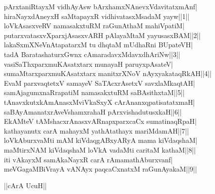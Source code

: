 \documentclass{article}
\begin{document}
pArxtaniRtayxM vidhAyAsw bArxhamxNAnevxVdavitatxmAnf|\\
hiraNayxdAneyxH saMtapayxR vidhivatasxMsadaM yayw||1||\\
loVkAsasxveRV namasakxtuRM raGunAthaM mahiVpatiM|\\
putarxvatasxvXparxjAsasxvARH pAlayaMtaM yayusasxBAM||2||\\
lakaSxmXNeVnAtapatarxM tu dhqtaM mUdhaRni BUpateVH|\\
tadA BaratashaturxGwnx cAmaradavxMdavxdhAriNw||3||\\
vasiSaThxparxmuKAsatxtarx munayaH paruyxpAsateV|\\
sumaMtarxparxmuKAsatxtarx manitxrXNoV nAyxyakataqRkAH||4||\\
EvaM parxvaqtetxV samayeV SaTAcxrAsetxV savxlaMkaqtAH|\\
samAjagumxnaRrapatiM namasakxtuRM saBAsithxtaM||5||\\
tAnavxkutxkAmAnasxMviVkaSxyX cArAnanxqpatisatatxmaH|\\
saBAyAmanatxrAveVshamxrahaH pArxvishadutusxkaH||6||\\
EkAMteV tAMshacxrAnasxvARnapxparxcaCx sumatinaqRpaH|\\
kathayanutx carA mahayxM yathAtathayx mariMdamAH||7||\\
loVkAburxvaMti mAM kiVdaqgABxyARyA mama kiVdaqshaM|\\
maMtirxNAM kiVdaqshaM loVkA vadaMti caritaM kathaM||8||\\
iti vAkayxM samAkaNayxR carA rAmamathAburxvanf|\\
meVGagaMBiVrayA vANAyx paqcaCxnatxM raGunAyakaM||9||\\

\begin{center}
||cArA UcuH||
\end{center}
\end{document}
